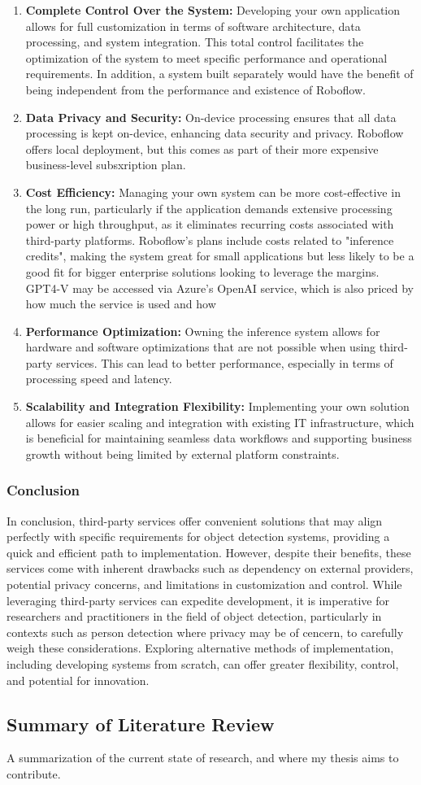 \begin{enumerate}
    \item \textbf{Complete Control Over the System:} Developing your own application allows for full customization in terms of software architecture, data processing, and system integration. This total control facilitates the optimization of the system to meet specific performance and operational requirements. In addition, a system built separately would have the benefit of being independent from the performance and existence of Roboflow.
    \item \textbf{Data Privacy and Security:} On-device processing ensures that all data processing is kept on-device, enhancing data security and privacy. Roboflow offers local deployment, but this comes as part of their more expensive business-level subsxription plan.
    \item \textbf{Cost Efficiency:} Managing your own system can be more cost-effective in the long run, particularly if the application demands extensive processing power or high throughput, as it eliminates recurring costs associated with third-party platforms. Roboflow's plans include costs related to "inference credits", making the system great for small applications but less likely to be a good fit for bigger enterprise solutions looking to leverage the margins. GPT4-V may be accessed via Azure's OpenAI service, which is also priced by how much the service is used and how
    \item \textbf{Performance Optimization:} Owning the inference system allows for hardware and software optimizations that are not possible when using third-party services. This can lead to better performance, especially in terms of processing speed and latency.
    \item \textbf{Scalability and Integration Flexibility:} Implementing your own solution allows for easier scaling and integration with existing IT infrastructure, which is beneficial for maintaining seamless data workflows and supporting business growth without being limited by external platform constraints.
\end{enumerate}

\subsubsection{Conclusion}

In conclusion, third-party services offer convenient solutions that may align perfectly with specific requirements for object detection systems, providing a quick and efficient path to implementation. However, despite their benefits, these services come with inherent drawbacks such as dependency on external providers, potential privacy concerns, and limitations in customization and control. While leveraging third-party services can expedite development, it is imperative for researchers and practitioners in the field of object detection, particularly in contexts such as person detection where privacy may be of cencern, to carefully weigh these considerations. Exploring alternative methods of implementation, including developing systems from scratch, can offer greater flexibility, control, and potential for innovation.

\subsection{Summary of Literature Review}
A summarization of the current state of research, and where my thesis aims to contribute.
